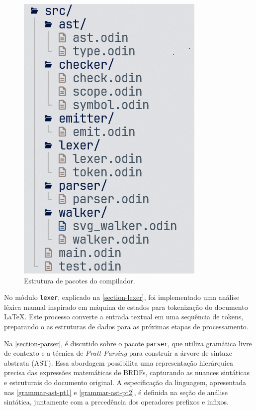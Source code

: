 \begin{figure}[!ht]
  \caption{\label{estrutura-de-pacotes} \small Estrutura de pacotes do compilador.}
  \begin{center}
    \includegraphics[scale=0.5]{./Imagens/package-structure.png}
  \end{center}
\end{figure}

No módulo \texttt{lexer}, explicado na \autoref{section-lexer}, foi implementado uma análise léxica manual inspirado em máquina de estados para tokenização do documento \LaTeX{}. Este processo converte a entrada textual em uma sequência de tokens, preparando o as estruturas de dados para as próximas etapas de processamento.


Na \autoref{section-parser}, é discutido sobre o pacote \texttt{parser}, que utiliza gramática livre de contexto e a técnica de \textit
{Pratt Parsing} para construir a árvore de sintaxe abstrata (AST). Essa abordagem possibilita uma representação hierárquica precisa das expressões matemáticas de BRDFs, capturando as nuances sintáticas e estruturais do documento original. A especificação da linguagem, apresentada nas \autoref{grammar-ast-pt1} e \autoref{grammar-ast-pt2}, é definida na seção de análise sintática, juntamente com a precedência dos operadores prefixos e infixos.

